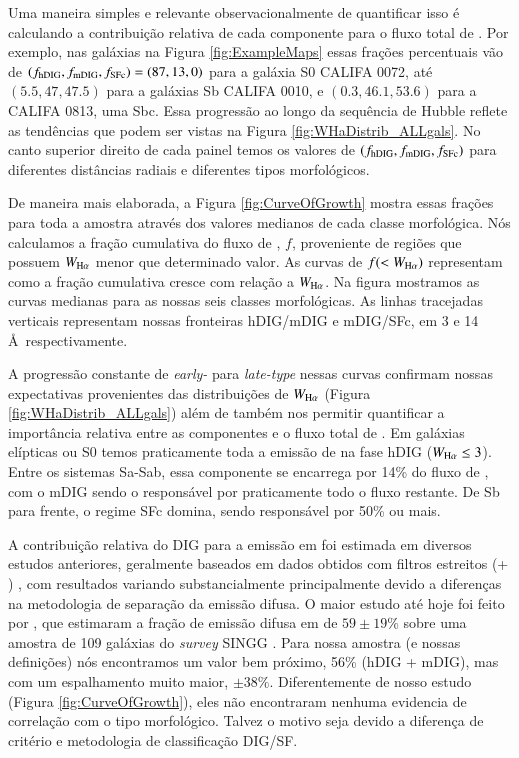 Uma maneira simples e relevante observacionalmente de quantificar isso é calculando a contribuição relativa de cada componente para o fluxo total de \Ha. Por exemplo, nas galáxias na Figura \ref{fig:ExampleMaps} essas frações percentuais vão de $(f_{\rm hDIG} , f_{\rm mDIG} , f_{\rm SFc}) = (87,13,0)$ para a galáxia S0 CALIFA 0072, até $(5.5,47,47.5)$ para a galáxias Sb CALIFA 0010, e $(0.3,46.1,53.6)$ para a CALIFA 0813, uma Sbc. Essa progressão ao longo da sequência de Hubble reflete as tendências que podem ser vistas na Figura \ref{fig:WHaDistrib_ALLgals}. No canto superior direito de cada painel temos os valores de $(f_{\rm hDIG} , f_{\rm mDIG} , f_{\rm SFc})$ para diferentes distâncias radiais e diferentes tipos morfológicos.

De maneira mais elaborada, a Figura \ref{fig:CurveOfGrowth} mostra essas frações para toda a amostra através dos valores medianos de cada classe morfológica. Nós calculamos a fração cumulativa do fluxo de \Ha, $f$, proveniente de regiões que possuem $W_{\Ha}$ menor que determinado valor. As curvas de $f(<W_{\Ha})$ representam como a fração cumulativa cresce com relação a $W_{\Ha}$. Na figura mostramos as curvas medianas para as nossas seis classes morfológicas. As linhas tracejadas verticais representam nossas fronteiras hDIG/mDIG e mDIG/SFc, em 3 e 14 \AA\ respectivamente.

A progressão constante de {\em early-} para {\em late-type} nessas curvas confirmam nossas expectativas provenientes das distribuições de $W_{\Ha}$ (Figura \ref{fig:WHaDistrib_ALLgals}) além de também nos permitir quantificar a importância relativa entre as componentes e o fluxo total de \Ha. Em galáxias elípticas ou S0 temos praticamente toda a emissão de \Ha na fase hDIG ($W_{\Ha} \le 3$). Entre os sistemas Sa-Sab, essa componente se encarrega por 14\% do fluxo de \Ha, com o mDIG sendo o responsável por praticamente todo o fluxo restante. De Sb para frente, o regime SFc domina, sendo responsável por 50\% ou mais.

A contribuição relativa do DIG para a emissão em \Ha foi estimada em diversos estudos anteriores, geralmente baseados em dados obtidos com filtros estreitos (\Ha + \nii) \citep{Ferguson.etal.1996, Zurita.etal.2000, Thilker.etal.2002, Oey.etal.2007}, com resultados variando substancialmente principalmente devido a diferenças na metodologia de separação da emissão difusa. O maior estudo até hoje foi feito por \citet{Oey.etal.2007}, que estimaram a fração de emissão difusa em \Ha de $59\pm19 \%$ sobre uma amostra de 109 galáxias do {\em survey} SINGG \citep{Meurer.etal.2006}. Para nossa amostra (e nossas definições) nós encontramos um valor bem próximo, 56\% (hDIG + mDIG), mas com um espalhamento muito maior, $\pm38 \%$. Diferentemente de nosso estudo (Figura \ref{fig:CurveOfGrowth}), eles não encontraram nenhuma evidencia de correlação com o tipo morfológico. Talvez o motivo seja devido a diferença de critério e metodologia de classificação DIG/SF.


